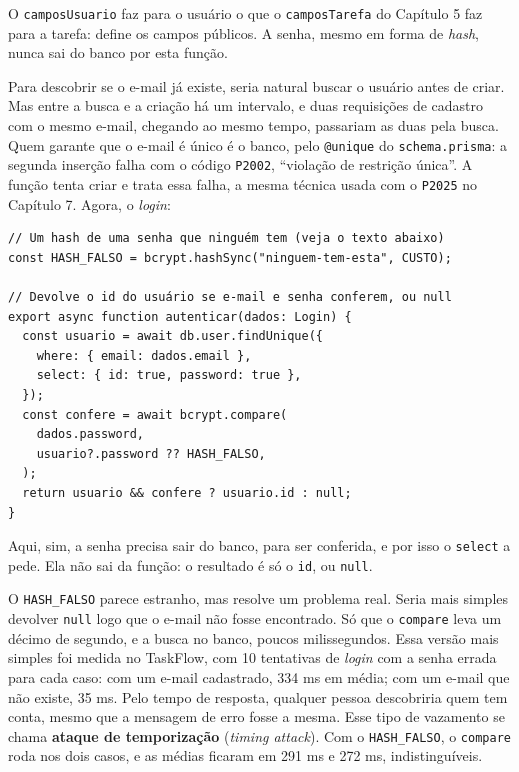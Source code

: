 O \texttt{camposUsuario} faz para o usuário o que o \texttt{camposTarefa} do Capítulo 5 faz para a tarefa: define os campos públicos. A senha, mesmo em forma de \textit{hash}, nunca sai do banco por esta função.

Para descobrir se o e-mail já existe, seria natural buscar o usuário antes de criar. Mas entre a busca e a criação há um intervalo, e duas requisições de cadastro com o mesmo e-mail, chegando ao mesmo tempo, passariam as duas pela busca. Quem garante que o e-mail é único é o banco, pelo \texttt{@unique} do \texttt{schema.prisma}: a segunda inserção falha com o código \texttt{P2002}, ``violação de restrição única''. A função tenta criar e trata essa falha, a mesma técnica usada com o \texttt{P2025} no Capítulo 7. Agora, o \textit{login}:

\begin{codigo}
\begin{Verbatim}[breaklines=true, breaksymbolleft={}, fontsize=\footnotesize]
// Um hash de uma senha que ninguém tem (veja o texto abaixo)
const HASH_FALSO = bcrypt.hashSync("ninguem-tem-esta", CUSTO);

// Devolve o id do usuário se e-mail e senha conferem, ou null
export async function autenticar(dados: Login) {
  const usuario = await db.user.findUnique({
    where: { email: dados.email },
    select: { id: true, password: true },
  });
  const confere = await bcrypt.compare(
    dados.password,
    usuario?.password ?? HASH_FALSO,
  );
  return usuario && confere ? usuario.id : null;
}
\end{Verbatim}
\end{codigo}

Aqui, sim, a senha precisa sair do banco, para ser conferida, e por isso o \texttt{select} a pede. Ela não sai da função: o resultado é só o \texttt{id}, ou \texttt{null}.

O \texttt{HASH\_FALSO} parece estranho, mas resolve um problema real. Seria mais simples devolver \texttt{null} logo que o e-mail não fosse encontrado. Só que o \texttt{compare} leva um décimo de segundo, e a busca no banco, poucos milissegundos. Essa versão mais simples foi medida no TaskFlow, com 10 tentativas de \textit{login} com a senha errada para cada caso: com um e-mail cadastrado, 334 ms em média; com um e-mail que não existe, 35 ms. Pelo tempo de resposta, qualquer pessoa descobriria quem tem conta, mesmo que a mensagem de erro fosse a mesma. Esse tipo de vazamento se chama \textbf{ataque de temporização} (\textit{timing attack}). Com o \texttt{HASH\_FALSO}, o \texttt{compare} roda nos dois casos, e as médias ficaram em 291 ms e 272 ms, indistinguíveis.

